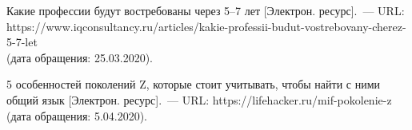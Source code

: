 \begin{thebibliography}{99}
\bibitem{}\BibAuthor{}Какие профессии будут востребованы через 5--7 лет [Электрон. ресурс].~--- URL: https://www.iqconsultancy.ru/articles/kakie-professii-budut-vostrebovany-cherez-5-7-let \\(дата обращения: 25.03.2020).

\bibitem{}\BibAuthor{}5 особенностей поколений Z, которые стоит учитывать, чтобы найти с ними общий язык [Электрон. ресурс].~--- URL: https://lifehacker.ru/mif-pokolenie-z (дата обращения: 5.04.2020).
\end{thebibliography}
